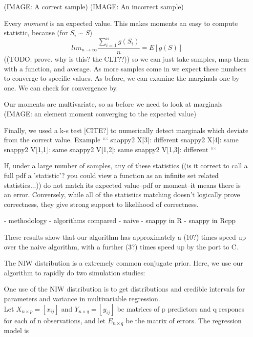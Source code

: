\documentclass[english]{report}
\begin{document}
(IMAGE: A correct sample)
(IMAGE: An incorrect sample)


Every \emph{moment} is an expected value. This makes moments an easy to compute statistic,
 because (for $ S_i \sim S $)
$$ lim_{n \rightarrow \infty} \frac{\sum_{i=1}^n g(S_i)}{n} = E[g(S)] $$
  ((TODO: prove. why is this? the CLT??))
so we can just take samples, map them with a function, and average. As more samples come in we expect these numbers to converge to specific values. As before, we can examine the marginals one by one. We can check for convergence by.

Our moments are multivariate, so as before we need to look at marginals 
(IMAGE: an element moment converging to the expected value)

Finally, we used a k-s test [CITE?] to numerically detect marginals which deviate from the correct value. Example 
```
snappy2 X[3]: different
snappy2 X[4]: same
snappy2 V[1,1]: same
snappy2 V[1,2]: same
snappy2 V[1,3]: different
```


If, under a large number of samples, any of these statistics ((is it correct to call a full pdf a 'statistic'? you could view a function as an infinite set related statistics...)) do not match its expected value--pdf or moment--it means there is an error. Conversely, while all of the statistics matching doesn't logically prove correctness, they give strong support to likelihood of correctness.




- methodology
- algorithms compared
  - naive
  - snappy in R
  - snappy in Rcpp

These results show that our algorithm has approximately a (10?) times speed up over the naive algorithm, with a further (3?) times speed up by the port to C.


The NIW distribution is a extremely common conjugate prior. Here, we use our algorithm to rapidly do two simulation studies:



One use of the NIW distribution is to get distributions and credible intervals for parameters and variance in multivariable regression.\\

Let $X_{n\times p} = [x_{ij}]$ and $Y_{n\times q} = [y_{ij}]$ be matrices of p predictors and q respones for each of n observations, and let $E_{n\times q}$ be the matrix of errors. The regression model is
\end{document}
